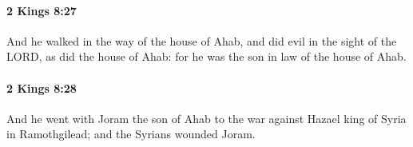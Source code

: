 		\paragraph{2 Kings 8:27} %
			\label{2KINGS-8-27}

			And he walked in the way of the house of Ahab, and did evil in the sight of the LORD, as did the house of Ahab: for he was the son in law of the house of Ahab.


		\paragraph{2 Kings 8:28} %
			\label{2KINGS-8-28}

			And he went with Joram the son of Ahab to the war against Hazael king of Syria in Ramothgilead; and the Syrians wounded Joram.


